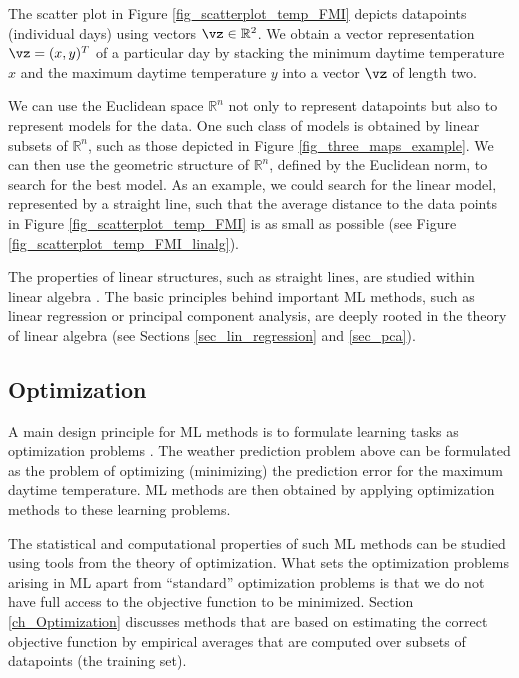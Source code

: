 \documentclass[12pt]{report}
\begin{document}
The scatter plot in Figure \ref{fig_scatterplot_temp_FMI} depicts 
datapoints (individual days) using vectors $\vz \in \mathbb{R}^{2}$. 
We obtain a vector representation $\vz=(x,y)^{T}$ of a particular 
day by stacking the minimum daytime temperature $x$ and the 
maximum daytime temperature $y$ into a vector $\vz$ of 
length two. 

We can use the Euclidean space $\mathbb{R}^{n}$ not only to represent 
datapoints but also to represent models for the data. One such class of 
models is obtained by linear subsets of $\mathbb{R}^{n}$, such as those 
depicted in Figure \ref{fig_three_maps_example}. We can then use the geometric 
structure of $\mathbb{R}^{n}$, defined by the Euclidean norm, to search 
for the best model. As an example, we could search for the linear model, 
represented by a straight line, such that the average distance to the data 
points in Figure \ref{fig_scatterplot_temp_FMI} is as small as possible 
(see Figure \ref{fig_scatterplot_temp_FMI_linalg}). 

The properties of linear structures, such as straight lines, are 
studied within linear algebra \cite{StrangLinAlg2016}. The basic 
principles behind important ML methods, such as linear regression 
or principal component analysis, are deeply rooted in the theory 
of linear algebra (see Sections \ref{sec_lin_regression} and \ref{sec_pca}).

\subsection{Optimization} 

A main design principle for ML methods is to formulate learning tasks as  
optimization problems \cite{OptMLBook}. The weather prediction problem 
above can be formulated as the problem of optimizing (minimizing) the 
prediction error for the maximum daytime temperature.  ML methods are 
then obtained by applying optimization methods to these learning problems. 

The statistical and computational properties of such ML methods can be 
studied using tools from the theory of optimization. What sets the optimization 
problems arising in ML apart from ``standard'' optimization problems is that 
we do not have full access to the objective function to be minimized. 
Section \ref{ch_Optimization} discusses methods that are based on estimating 
the correct objective function by empirical averages that 
are computed over subsets of datapoints (the training set). 
\end{document}
